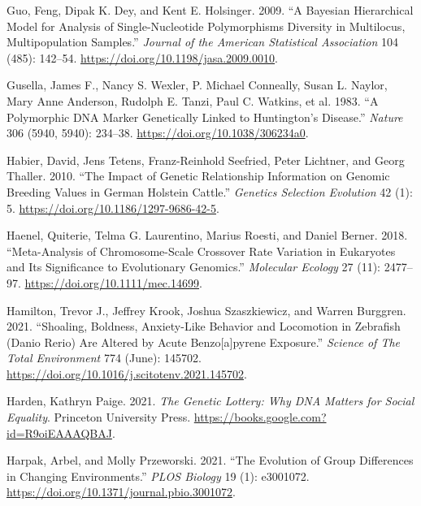 \documentclass[
]{book}
\newlength{\cslhangindent}
\newlength{\cslentryspacingunit} %
\newenvironment{CSLReferences}[2] %
 {%
  \setlength{\parindent}{0pt}
  \ifodd #1
  \let\oldpar\par
  \def\par{\hangindent=\cslhangindent\oldpar}
  \fi
  \setlength{\parskip}{#2\cslentryspacingunit}
 }%
 {}
\begin{document}
\begin{CSLReferences}{1}{0}
\leavevmode{}%
Guo, Feng, Dipak K. Dey, and Kent E. Holsinger. 2009. {``A {Bayesian Hierarchical Model} for {Analysis} of {Single-Nucleotide Polymorphisms Diversity} in {Multilocus}, {Multipopulation Samples}.''} \emph{Journal of the American Statistical Association} 104 (485): 142--54. \url{https://doi.org/10.1198/jasa.2009.0010}.

\leavevmode{}%
Gusella, James F., Nancy S. Wexler, P. Michael Conneally, Susan L. Naylor, Mary Anne Anderson, Rudolph E. Tanzi, Paul C. Watkins, et al. 1983. {``A Polymorphic {DNA} Marker Genetically Linked to {Huntington}'s Disease.''} \emph{Nature} 306 (5940, 5940): 234--38. \url{https://doi.org/10.1038/306234a0}.

\leavevmode{}%
Habier, David, Jens Tetens, Franz-Reinhold Seefried, Peter Lichtner, and Georg Thaller. 2010. {``The Impact of Genetic Relationship Information on Genomic Breeding Values in {German Holstein} Cattle.''} \emph{Genetics Selection Evolution} 42 (1): 5. \url{https://doi.org/10.1186/1297-9686-42-5}.

\leavevmode{}%
Haenel, Quiterie, Telma G. Laurentino, Marius Roesti, and Daniel Berner. 2018. {``Meta-Analysis of Chromosome-Scale Crossover Rate Variation in Eukaryotes and Its Significance to Evolutionary Genomics.''} \emph{Molecular Ecology} 27 (11): 2477--97. \url{https://doi.org/10.1111/mec.14699}.

\leavevmode{}%
Hamilton, Trevor J., Jeffrey Krook, Joshua Szaszkiewicz, and Warren Burggren. 2021. {``Shoaling, Boldness, Anxiety-Like Behavior and Locomotion in Zebrafish ({Danio} Rerio) Are Altered by Acute Benzo{[}a{]}pyrene Exposure.''} \emph{Science of The Total Environment} 774 (June): 145702. \url{https://doi.org/10.1016/j.scitotenv.2021.145702}.

\leavevmode{}%
Harden, Kathryn Paige. 2021. \emph{The {Genetic Lottery}: {Why DNA Matters} for {Social Equality}}. {Princeton University Press}. \url{https://books.google.com?id=R9oiEAAAQBAJ}.

\leavevmode{}%
Harpak, Arbel, and Molly Przeworski. 2021. {``The Evolution of Group Differences in Changing Environments.''} \emph{PLOS Biology} 19 (1): e3001072. \url{https://doi.org/10.1371/journal.pbio.3001072}.


\end{CSLReferences}
\end{document}
